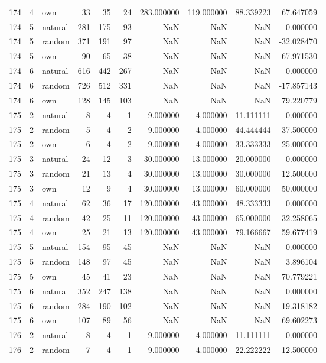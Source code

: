 \begin{table}[htbp]
\begin{tabular}{rrlrrrrrrr}
174 & 4 & own & 33 & 35 & 24 & 283.000000 & 119.000000 & 88.339223 & 67.647059 \\
174 & 5 & natural & 281 & 175 & 93 & NaN & NaN & NaN & 0.000000 \\
174 & 5 & random & 371 & 191 & 97 & NaN & NaN & NaN & -32.028470 \\
174 & 5 & own & 90 & 65 & 38 & NaN & NaN & NaN & 67.971530 \\
174 & 6 & natural & 616 & 442 & 267 & NaN & NaN & NaN & 0.000000 \\
174 & 6 & random & 726 & 512 & 331 & NaN & NaN & NaN & -17.857143 \\
174 & 6 & own & 128 & 145 & 103 & NaN & NaN & NaN & 79.220779 \\
175 & 2 & natural & 8 & 4 & 1 & 9.000000 & 4.000000 & 11.111111 & 0.000000 \\
175 & 2 & random & 5 & 4 & 2 & 9.000000 & 4.000000 & 44.444444 & 37.500000 \\
175 & 2 & own & 6 & 4 & 2 & 9.000000 & 4.000000 & 33.333333 & 25.000000 \\
175 & 3 & natural & 24 & 12 & 3 & 30.000000 & 13.000000 & 20.000000 & 0.000000 \\
175 & 3 & random & 21 & 13 & 4 & 30.000000 & 13.000000 & 30.000000 & 12.500000 \\
175 & 3 & own & 12 & 9 & 4 & 30.000000 & 13.000000 & 60.000000 & 50.000000 \\
175 & 4 & natural & 62 & 36 & 17 & 120.000000 & 43.000000 & 48.333333 & 0.000000 \\
175 & 4 & random & 42 & 25 & 11 & 120.000000 & 43.000000 & 65.000000 & 32.258065 \\
175 & 4 & own & 25 & 21 & 13 & 120.000000 & 43.000000 & 79.166667 & 59.677419 \\
175 & 5 & natural & 154 & 95 & 45 & NaN & NaN & NaN & 0.000000 \\
175 & 5 & random & 148 & 97 & 45 & NaN & NaN & NaN & 3.896104 \\
175 & 5 & own & 45 & 41 & 23 & NaN & NaN & NaN & 70.779221 \\
175 & 6 & natural & 352 & 247 & 138 & NaN & NaN & NaN & 0.000000 \\
175 & 6 & random & 284 & 190 & 102 & NaN & NaN & NaN & 19.318182 \\
175 & 6 & own & 107 & 89 & 56 & NaN & NaN & NaN & 69.602273 \\
176 & 2 & natural & 8 & 4 & 1 & 9.000000 & 4.000000 & 11.111111 & 0.000000 \\
176 & 2 & random & 7 & 4 & 1 & 9.000000 & 4.000000 & 22.222222 & 12.500000 \\

\end{tabular}
\end{table}
